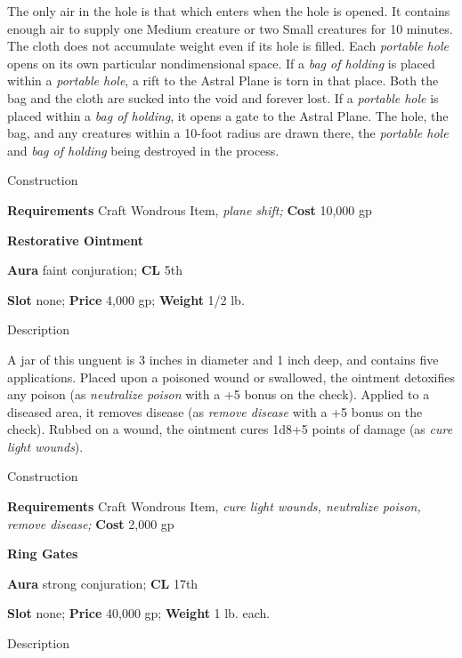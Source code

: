 The only air in the hole is that which enters when the hole is opened. It contains enough air to supply one Medium creature or two Small creatures for 10 minutes. The cloth does not accumulate weight even if its hole is filled. Each \textit{portable hole} opens on its own particular nondimensional space. If a \textit{bag of holding} is placed within a \textit{portable hole}, a rift to the Astral Plane is torn in that place. Both the bag and the cloth are sucked into the void and forever lost. If a \textit{portable hole} is placed within a \textit{bag of holding}, it opens a gate to the Astral Plane. The hole, the bag, and any creatures within a 10-foot radius are drawn there, the \textit{portable hole} and \textit{bag of holding} being destroyed in the process. 
				
Construction
				
\textbf{Requirements} Craft Wondrous Item,\textit{ plane shift;}\textbf{ Cost }10,000 gp
				
\textbf{Restorative Ointment}
				
\textbf{Aura} faint conjuration;\textbf{ CL }5th
				
\textbf{Slot} none; \textbf{Price} 4,000 gp; \textbf{Weight} 1/2 lb.
				
Description
				
A jar of this unguent is 3 inches in diameter and 1 inch deep, and contains five applications. Placed upon a poisoned wound or swallowed, the ointment detoxifies any poison (as \textit{neutralize poison} with a +5 bonus on the check). Applied to a diseased area, it removes disease (as \textit{remove disease }with a +5 bonus on the check). Rubbed on a wound, the ointment cures 1d8+5 points of damage (as \textit{cure light wounds}). 
				
Construction
				
\textbf{Requirements} Craft Wondrous Item,\textit{ cure light wounds, neutralize poison, remove disease;}\textbf{ Cost }2,000 gp
				
\textbf{Ring Gates}
				
\textbf{Aura} strong conjuration;\textbf{ CL }17th
				
\textbf{Slot} none; \textbf{Price} 40,000 gp; \textbf{Weight} 1 lb. each.
				
Description
				
